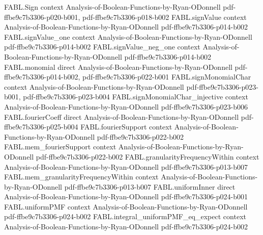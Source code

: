 \begin{theorem}
\label{FABL.FiniteFourierBasis.project_orthogonalDoobMartingale}
\leanok
{}
\proofstep
  {FABL.Sign}
  {context}
  {Analysis-of-Boolean-Functions-by-Ryan-ODonnell}
  {pdf-ffbe9c7b3306-p020-b001,
    pdf-ffbe9c7b3306-p018-b002}
\proofstep
  {FABL.signValue}
  {context}
  {Analysis-of-Boolean-Functions-by-Ryan-ODonnell}
  {pdf-ffbe9c7b3306-p014-b002}
\proofstep
  {FABL.signValue_one}
  {context}
  {Analysis-of-Boolean-Functions-by-Ryan-ODonnell}
  {pdf-ffbe9c7b3306-p014-b002}
\proofstep
  {FABL.signValue_neg_one}
  {context}
  {Analysis-of-Boolean-Functions-by-Ryan-ODonnell}
  {pdf-ffbe9c7b3306-p014-b002}
\proofstep
  {FABL.monomial}
  {direct}
  {Analysis-of-Boolean-Functions-by-Ryan-ODonnell}
  {pdf-ffbe9c7b3306-p014-b002,
    pdf-ffbe9c7b3306-p022-b001}
\proofstep
  {FABL.signMonomialChar}
  {context}
  {Analysis-of-Boolean-Functions-by-Ryan-ODonnell}
  {pdf-ffbe9c7b3306-p023-b001,
    pdf-ffbe9c7b3306-p023-b004}
\proofstep
  {FABL.signMonomialChar_injective}
  {context}
  {Analysis-of-Boolean-Functions-by-Ryan-ODonnell}
  {pdf-ffbe9c7b3306-p023-b006}
\proofstep
  {FABL.fourierCoeff}
  {direct}
  {Analysis-of-Boolean-Functions-by-Ryan-ODonnell}
  {pdf-ffbe9c7b3306-p025-b004}
\proofstep
  {FABL.fourierSupport}
  {context}
  {Analysis-of-Boolean-Functions-by-Ryan-ODonnell}
  {pdf-ffbe9c7b3306-p022-b002}
\proofstep
  {FABL.mem_fourierSupport}
  {context}
  {Analysis-of-Boolean-Functions-by-Ryan-ODonnell}
  {pdf-ffbe9c7b3306-p022-b002}
\proofstep
  {FABL.granularityFrequencyWithin}
  {context}
  {Analysis-of-Boolean-Functions-by-Ryan-ODonnell}
  {pdf-ffbe9c7b3306-p013-b007}
\proofstep
  {FABL.mem_granularityFrequencyWithin}
  {context}
  {Analysis-of-Boolean-Functions-by-Ryan-ODonnell}
  {pdf-ffbe9c7b3306-p013-b007}
\proofstep
  {FABL.uniformInner}
  {direct}
  {Analysis-of-Boolean-Functions-by-Ryan-ODonnell}
  {pdf-ffbe9c7b3306-p024-b001}
\proofstep
  {FABL.uniformPMF}
  {context}
  {Analysis-of-Boolean-Functions-by-Ryan-ODonnell}
  {pdf-ffbe9c7b3306-p024-b002}
\proofstep
  {FABL.integral_uniformPMF_eq_expect}
  {context}
  {Analysis-of-Boolean-Functions-by-Ryan-ODonnell}
  {pdf-ffbe9c7b3306-p024-b002}

\end{theorem}
